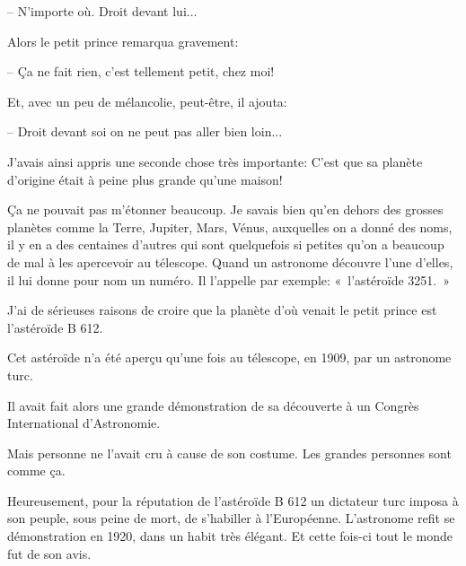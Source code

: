 \documentclass[a4paper]{report}
\begin{document}
-- N'importe où. Droit devant lui... 

Alors le petit prince remarqua gravement:

-- Ça ne fait rien, c'est tellement petit, chez moi! 

Et, avec un peu de mélancolie, peut-être, il ajouta: 

-- Droit devant soi on ne peut pas aller bien loin...

\parachapter[IV]{} %
J'avais ainsi appris une seconde chose très importante: C'est que sa planète d'origine était à peine plus grande qu'une maison!

Ça ne pouvait pas m'étonner beaucoup. Je savais bien qu'en dehors des grosses planètes comme la Terre, Jupiter, Mars, Vénus, auxquelles on a donné des noms, il y en a des centaines d'autres qui sont quelquefois si petites qu'on a beaucoup de mal à les apercevoir au télescope. Quand un astronome découvre l'une d'elles, il lui donne pour nom un numéro. Il l'appelle par exemple: «~l'astéroïde 3251.~»

J'ai de sérieuses raisons de croire que la planète d'où venait le petit prince est l'astéroïde B 612.

Cet astéroïde n'a été aperçu qu'une fois au télescope, en 1909, par un astronome turc.


Il avait fait alors une grande démonstration de sa découverte à un Congrès International d'Astronomie. 

Mais personne ne l'avait cru à cause de son costume. Les grandes personnes sont comme ça.


Heureusement, pour la réputation de l'astéroïde B 612 un dictateur turc imposa à son peuple, sous peine de mort, de s'habiller à l'Européenne. L'astronome refit se démonstration en 1920, dans un habit très élégant. Et cette fois-ci tout le monde fut de son avis.

\end{document}
